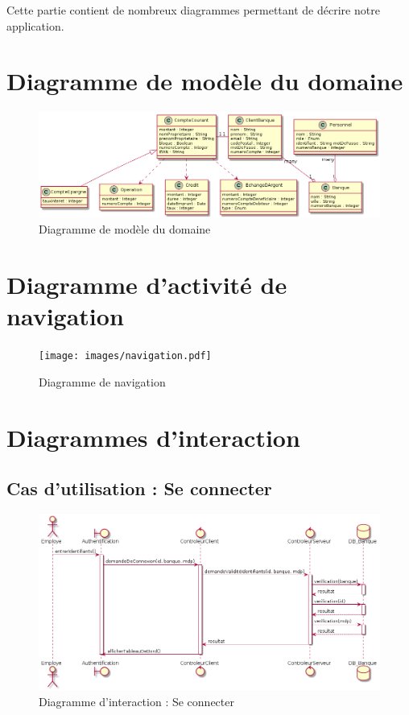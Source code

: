 Cette partie contient de nombreux diagrammes permettant de décrire notre application.
\section{Diagramme de modèle du domaine}
\begin{figure}[h!]
\begin{center}
   \caption{Diagramme de modèle du domaine}
   \includegraphics[scale=0.5]{images/modeleDuDomaine.png}
   \end{center}
\end{figure}
\newpage
\section{Diagramme d'activité de navigation}
\begin{figure}[h!]
\begin{center}
   \caption{Diagramme de navigation}
   \texttt{[image: images/navigation.pdf]}
   \end{center}
\end{figure}
\newpage
\section{Diagrammes d'interaction}
\subsection{Cas d'utilisation : Se connecter}
\begin{figure}[h!]
\begin{center}
   \caption{Diagramme d'interaction : Se connecter}
   \includegraphics[scale=0.5]{images/seConnecterIR.png}
   \end{center}
\end{figure}
